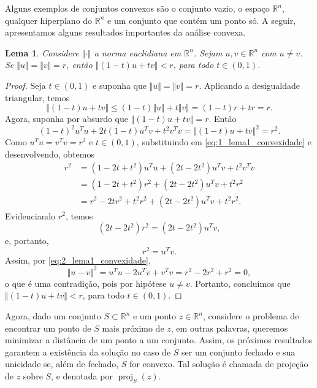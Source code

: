 \documentclass[12pt,a4paper]{scrartcl}
\DeclareMathOperator{\proj}{proj}
\def\RR{\mathds{R}}
\newtheorem{lema}{Lema}
\theoremstyle{definition}%
\begin{document}
Alguns exemplos de conjuntos convexos são o conjunto vazio, o espaço $\RR^{n}$, qualquer hiperplano do $\RR^{n}$ e um conjunto que contém um ponto só. A seguir, apresentamos alguns resultados importantes da análise convexa.

\begin{lema} \label{lema:1_convexidade}
Considere $\Vert \cdot \Vert$ a norma euclidiana em $\RR^{n}$. Sejam $u,v \in \RR^{n}$ com $u\neq v$. Se $\Vert u \Vert = \Vert v \Vert = r$, então $\Vert (1-t)u + tv \Vert < r$, para todo $t \in (0,1)$.
\end{lema}

\begin{proof}
Seja $t \in (0,1)$ e suponha que $\Vert u \Vert = \Vert v \Vert = r$. Aplicando a desigualdade triangular, temos
\[
\Vert (1-t)u + tv \Vert \leq (1-t)\Vert u \Vert + t\Vert v \Vert = (1-t)r + tr = r.
\]
Agora, suponha por absurdo que $\Vert (1-t)u + tv \Vert = r$. Então
\[ \label{eq:1_lema1_convexidade}
(1-t)^{2} u^{T}u + 2t(1-t)u^{T}v + t^{2}v^{T}v = \Vert (1-t)u + tv \Vert^{2} = r^{2}.
\]
Como $u^{T}u = v^{T}v = r^{2}$ e $t \in (0,1)$, substituindo em \eqref{eq:1_lema1_convexidade} e desenvolvendo, obtemos 
\begin{align}
r^{2} &= (1-2t+t^{2}) u^{T}u + (2t-2t^{2})u^{T}v + t^{2}v^{T}v \\
&= (1-2t+t^{2}) r^{2} + (2t-2t^{2})u^{T}v + t^{2}r^{2} \\
&= r^{2} - 2tr^{2} + t^{2}r^{2} + (2t-2t^{2})u^{T}v + t^{2}r^{2} .
\end{align}
Evidenciando $r^{2}$, temos
\[ 
(2t-2t^{2})r^{2} = (2t-2t^{2})u^{T}v,
\]
e, portanto,
\[ \label{eq:2_lema1_convexidade}
r^{2} = u^{T}v.
\]
Assim, por \eqref{eq:2_lema1_convexidade},
\[
\Vert u-v \Vert^{2} = u^{T}u - 2u^{T}v + v^{T}v = r^{2} - 2r^{2} + r^{2} = 0,
\]
o que é uma contradição, pois por hipótese $u \neq v$. 
Portanto, concluímos que $\Vert (1-t)u + tv \Vert < r$, para todo $t \in (0,1)$.
\end{proof}

Agora, dado um conjunto $S \subset \RR^{n}$ e um ponto $z \in \RR^{n}$, considere o problema de encontrar um ponto de $S$ mais próximo de $z$, em outras palavras, queremos minimizar a distância de um ponto a um conjunto. Assim, os próximos resultados garantem a existência da solução no caso de $S$ ser um conjunto fechado e sua unicidade se, além de fechado, $S$ for convexo. Tal solução é chamada de projeção de $z$ sobre $S$, e denotada por $\proj_{S} (z)$. 
\end{document}
